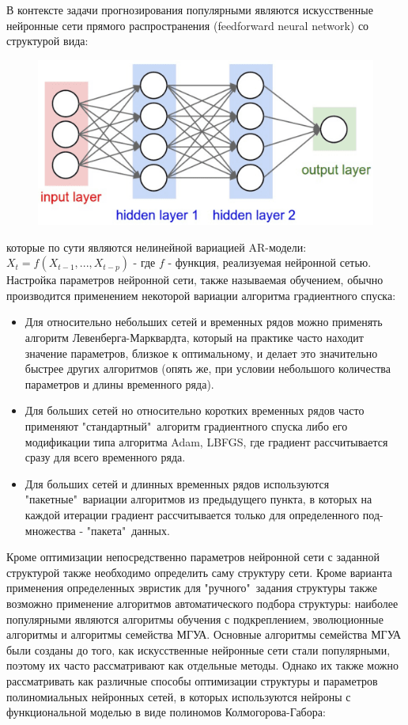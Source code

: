 \documentclass[11pt]{article}
\begin{document}
В контексте задачи прогнозирования популярными являются искусственные нейронные сети прямого распространения (feedforward neural network) со структурой вида:
\begin{figure}[H]
\centering
\includegraphics[scale=0.4]{ff-neural-net.png}
\label{}
\end{figure}
которые по сути являются нелинейной вариацией AR-модели: $X_t = f(X_{t-1},...,X_{t-p})$ - где $f$ - функция, реализуемая нейронной сетью.
Настройка параметров нейронной сети, также называемая обучением, обычно производится применением некоторой вариации алгоритма градиентного спуска:
\begin{itemize}
\item Для относительно небольших сетей и временных рядов можно применять алгоритм Левенберга-Марквардта, который на практике часто находит значение параметров, близкое к оптимальному, и делает это значительно быстрее других алгоритмов (опять же, при условии небольшого количества параметров и длины временного ряда). 
\item Для больших сетей но относительно коротких временных рядов часто применяют "стандартный"\ алгоритм градиентного спуска либо его модификации типа алгоритма Adam, LBFGS, где градиент рассчитывается сразу для всего временного ряда.
\item Для больших сетей и длинных временных рядов используются "пакетные"\ вариации алгоритмов из предыдущего пункта, в которых на каждой итерации градиент рассчитывается только для определенного под-множества - "пакета"\ данных.
\end{itemize}
Кроме оптимизации непосредственно параметров нейронной сети с заданной структурой также необходимо определить саму структуру сети. Кроме варианта применения определенных эвристик для "ручного"\ задания структуры также возможно применение алгоритмов автоматического подбора структуры: наиболее популярными являются алгоритмы обучения с подкреплением, эволюционные алгоритмы и алгоритмы семейства МГУА. Основные алгоритмы семейства МГУА были созданы до того, как искусственные нейронные сети стали популярными, поэтому их часто рассматривают как отдельные методы. Однако их также можно рассматривать как различные способы оптимизации структуры и параметров полиномиальных нейронных сетей, в которых используются нейроны с функциональной моделью в виде полиномов Колмогорова-Габора:
\end{document}
